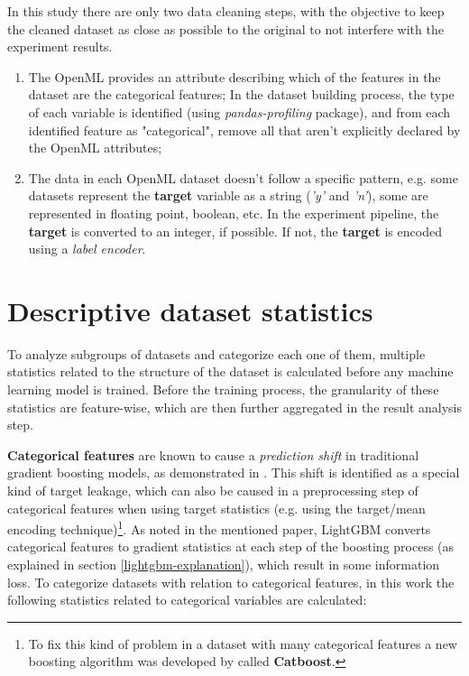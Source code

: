 In this study there are only two data cleaning steps, with the objective to keep the cleaned dataset as close as possible to the original to not interfere with the experiment results.
\begin{enumerate}
    \item The OpenML provides an attribute describing which of the features in the dataset are the categorical features; In the dataset building process, the type of each variable is identified (using \textit{pandas-profiling} package), and from each identified feature as "categorical", remove all that aren't explicitly declared by the OpenML attributes;
    \item The data in each OpenML dataset doesn't follow a specific pattern, e.g. some datasets represent the \textbf{target} variable as a string (\textit{'y'} and \textit{'n'}), some are represented in floating point, boolean, etc. In the experiment pipeline, the \textbf{target} is converted to an integer, if possible. If not, the \textbf{target} is encoded using a \textit{label encoder}.
\end{enumerate}

\section{Descriptive dataset statistics}
\label{dataset-aggregated-statistics}

To analyze subgroups of datasets and categorize each one of them, multiple statistics related to the structure of the dataset is calculated before any machine learning model is trained. Before the training process, the granularity of these statistics are feature-wise, which are then further aggregated in the result analysis step.

\textbf{Categorical features} are known to cause a \textit{prediction shift} in traditional gradient boosting models, as demonstrated in \cite{prokhorenkova2018catboost}. This shift is identified as a special kind of target leakage, which can also be caused in a preprocessing step of categorical features when using target statistics (e.g. using the target/mean encoding technique)\footnote{To fix this kind of problem in a dataset with many categorical features a new boosting algorithm was developed by \cite{dorogush2018catboost} called \textbf{Catboost}.}. As noted in the mentioned paper, LightGBM converts categorical features to gradient statistics at each step of the boosting process (as explained in section \ref{lightgbm-explanation}), which result in some information loss. To categorize datasets with relation to categorical features, in this work the following statistics related to categorical variables are calculated:


